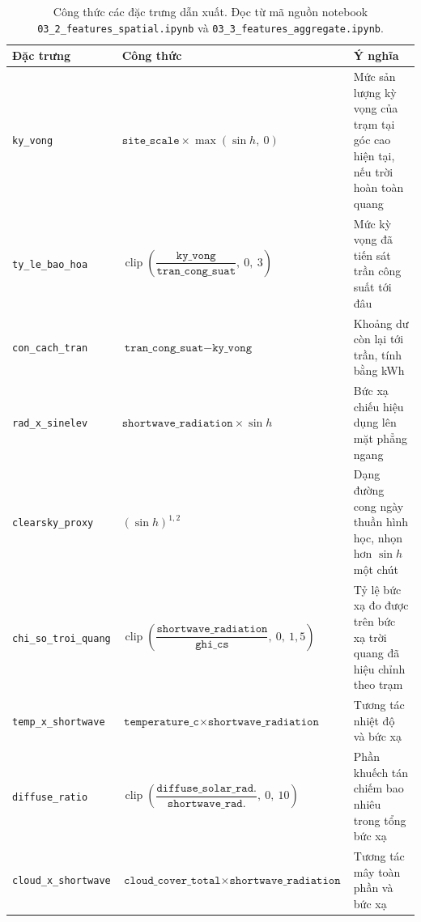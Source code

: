 \documentclass[12pt, a4paper]{report}
\begin{document}
\begin{table}[htbp]
\centering
\caption{Công thức các đặc trưng dẫn xuất. Đọc từ mã nguồn notebook
\texttt{03\_2\_features\_spatial.ipynb} và \texttt{03\_3\_features\_aggregate.ipynb}.}
\label{tab:dinh_nghia_dan_xuat}
\small
\begin{tabular}{@{}L{4.0cm} L{7.0cm} L{4.1cm}@{}}
\toprule
\textbf{Đặc trưng} & \textbf{Công thức} & \textbf{Ý nghĩa} \\
\midrule
\texttt{ky\_vong} &
$\texttt{site\_scale} \times \max(\sin h,\ 0)$ &
Mức sản lượng kỳ vọng của trạm tại góc cao hiện tại, nếu trời hoàn toàn quang \\
\addlinespace
\texttt{ty\_le\_bao\_hoa} &
$\operatorname{clip}\!\left(\dfrac{\texttt{ky\_vong}}{\texttt{tran\_cong\_suat}},\ 0,\ 3\right)$ &
Mức kỳ vọng đã tiến sát trần công suất tới đâu \\
\addlinespace
\texttt{con\_cach\_tran} &
$\texttt{tran\_cong\_suat} - \texttt{ky\_vong}$ &
Khoảng dư còn lại tới trần, tính bằng kWh \\
\addlinespace
\texttt{rad\_x\_sinelev} &
$\texttt{shortwave\_radiation} \times \sin h$ &
Bức xạ chiếu hiệu dụng lên mặt phẳng ngang \\
\addlinespace
\texttt{clearsky\_proxy} &
$(\sin h)^{1{,}2}$ &
Dạng đường cong ngày thuần hình học, nhọn hơn $\sin h$ một chút \\
\addlinespace
\texttt{chi\_so\_troi\_quang} &
$\operatorname{clip}\!\left(\dfrac{\texttt{shortwave\_radiation}}{\texttt{ghi\_cs}},\ 0,\ 1{,}5\right)$ &
Tỷ lệ bức xạ đo được trên bức xạ trời quang đã hiệu chỉnh theo trạm \\
\addlinespace
\texttt{temp\_x\_shortwave} &
$\texttt{temperature\_c} \times \texttt{shortwave\_radiation}$ &
Tương tác nhiệt độ và bức xạ \\
\addlinespace
\texttt{diffuse\_ratio} &
$\operatorname{clip}\!\left(\dfrac{\texttt{diffuse\_solar\_rad.}}{\texttt{shortwave\_rad.}},\ 0,\ 10\right)$ &
Phần khuếch tán chiếm bao nhiêu trong tổng bức xạ \\
\addlinespace
\texttt{cloud\_x\_shortwave} &
$\texttt{cloud\_cover\_total} \times \texttt{shortwave\_radiation}$ &
Tương tác mây toàn phần và bức xạ \\
\bottomrule
\end{tabular}
\end{table}
\end{document}
